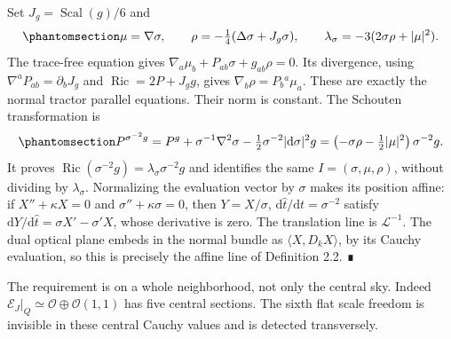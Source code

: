 \documentclass[
  english,
  11pt,
  reqno]{amsart}
\begin{document}
Set \(J_g=\operatorname{Scal}(g)/6\) and
\begin{equation}\protect\phantomsection\label{eq:gg-selected-scale-prolongation}{
 \mu=\nabla\sigma,\qquad
 \rho=-\tfrac14(\Delta\sigma+J_g\sigma),\qquad
 \lambda_\sigma=-3(2\sigma\rho+|\mu|^2).
}\end{equation} The trace-free equation gives
\(\nabla_a\mu_b+P_{ab}\sigma+g_{ab}\rho=0\). Its divergence, using
\(\nabla^aP_{ab}=\partial_bJ_g\) and \(\operatorname{Ric}=2P+J_gg\),
gives \(\nabla_b\rho=P_b{}^a\mu_a\). These are exactly the normal
tractor parallel equations. Their norm is constant. The Schouten
transformation is
\begin{equation}\protect\phantomsection\label{eq:gg-optical-einstein-schouten}{
 P^{\sigma^{-2}g}
  =P^g+\sigma^{-1}\nabla^2\sigma
               -\tfrac12\sigma^{-2}|\mathrm d\sigma|^2g
  =\left(-\sigma\rho-\tfrac12|\mu|^2\right)\sigma^{-2}g .
}\end{equation} It proves
\(\operatorname{Ric}(\sigma^{-2}g)=\lambda_\sigma\sigma^{-2}g\) and
identifies the same \(I=(\sigma,\mu,\rho)\), without dividing by
\(\lambda_\sigma\). Normalizing the evaluation vector by \(\sigma\)
makes its position affine: if \(X''+\kappa X=0\) and
\(\sigma''+\kappa\sigma=0\), then \(Y=X/\sigma\),
\(\mathrm d\widehat t/\mathrm dt=\sigma^{-2}\) satisfy
\(\mathrm dY/\mathrm d\widehat t=\sigma X'-\sigma'X\), whose derivative
is zero. The translation line is \(\mathcal L^{-1}\). The dual optical
plane embeds in the normal bundle as \(\langle X,D_kX\rangle\), by its
Cauchy evaluation, so this is precisely the affine line of Definition
2.2. ∎

The requirement is on a whole neighborhood, not only the central sky.
Indeed \(\mathcal E_J|_Q\simeq\mathcal O\oplus\mathcal O(1,1)\) has five
central sections. The sixth flat scale freedom is invisible in these
central Cauchy values and is detected transversely.
\end{document}
